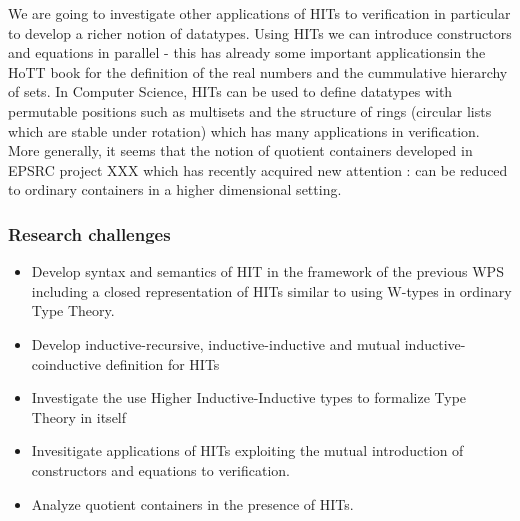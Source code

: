 \documentclass[twocolumn,a4paper,11pt]{article}
\newcommand{\Rypacek}{Ryp\'a\v{c}ek}
\begin{document}
We are going to investigate other applications of HITs to verification in
particular to develop a richer notion of datatypes. Using HITs we can
introduce constructors and equations in parallel - this has already
some important applicationsin the HoTT book for the definition of the
real numbers and the cummulative hierarchy of sets.
%
In Computer Science, HITs can be used to define datatypes with
permutable positions such as multisets and the structure of rings
(circular lists which are stable under rotation) which has many
applications in verification. More generally, it seems that the notion
of quotient containers \cite{abottAltenGhaniMcB:quotientContainers}
developed in EPSRC project XXX which has recently acquired new
attention \cite{gylterud:thesis,kock:groupoids}: can be reduced to
ordinary containers in a higher dimensional setting.


\subsubsection*{Research challenges}

\begin{itemize}

\item Develop syntax and semantics of HIT in the framework of the
  previous WPS including a closed representation of HITs similar to using
  W-types in ordinary Type Theory.


\item Develop inductive-recursive, inductive-inductive
  and mutual inductive-coinductive definition for HITs

\item Investigate the use Higher Inductive-Inductive types to formalize
  Type Theory in itself

\item Invesitigate applications of HITs exploiting the mutual
  introduction of constructors and equations to verification.

\item Analyze quotient containers in the presence of HITs.


\end{itemize}
\end{document}

